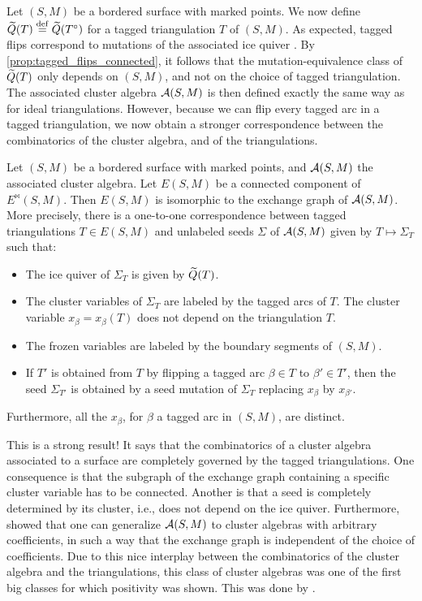 Let $(S, M)$ be a bordered surface with marked points. We now define $\widetilde{Q}(T) \overset{\mathrm{def}}{=}
	\widetilde{Q}(T^\circ)$ for a tagged triangulation $T$ of $(S, M)$. As expected, tagged flips
correspond to mutations of the associated ice quiver \parencite[Lemma 9.7]{FominShapiroThurston2008CATriangulatedSurfacesI}. By
\cref{prop:tagged_flips_connected}, it follows that the mutation-equivalence class of
$\widetilde{Q}(T)$ only depends on $(S, M)$, and not on the choice of tagged triangulation. The
associated cluster algebra $\mathcal{A}(S, M)$ is then defined exactly the same way as for
ideal triangulations. However, because we can flip every tagged arc in a tagged
triangulation, we now obtain a stronger correspondence between the combinatorics of the
cluster algebra, and of the triangulations.

\begin{theorem}\label{thm:clusters_and_triangulations}

	Let $(S, M)$ be a bordered surface with marked points, and $\mathcal{A}(S, M)$ the associated
	cluster algebra. Let $E(S, M)$ be a connected component of $E^{\bowtie}(S, M)$. Then
	$E(S, M)$ is isomorphic to the exchange graph of $\mathcal{A}(S, M)$. More precisely, there is
	a one-to-one correspondence between tagged triangulations $T \in E(S, M)$ and unlabeled
	seeds $\Sigma$ of $\mathcal{A}(S, M)$ given by $T \mapsto \Sigma_T$ such that:
	\begin{itemize}
		\item The ice quiver of $\Sigma_T$ is given by $\widetilde{Q}(T)$.
		\item The cluster variables of $\Sigma_T$ are labeled by the tagged arcs of $T$. The cluster
		      variable $x_\beta = x_\beta(T)$ does not depend on the triangulation $T$.
		\item The frozen variables are labeled by the boundary segments of $(S, M)$.
		\item If $T'$ is obtained from $T$ by flipping a tagged arc $\beta \in T$ to $\beta' \in T'$,
		      then the seed $\Sigma_{T'}$ is obtained by a seed mutation of $\Sigma_T$ replacing
		      $x_{\beta}$ by $x_{\beta'}$.
	\end{itemize}
	Furthermore, all the $x_\beta$, for $\beta$ a tagged arc in $(S,M)$, are distinct.
\end{theorem}

This is a strong result! It says that the combinatorics of a cluster algebra associated
to a surface are completely governed by the tagged triangulations. One consequence is
that the subgraph of the exchange graph containing a specific cluster variable has to
be connected. Another is that a seed is completely determined by its cluster, i.e.,
does not depend on the ice quiver. Furthermore,
\textcite{FominThurston2018CATriangulatedSurfacesII} showed that one can generalize
$\mathcal{A}(S, M)$ to cluster algebras with arbitrary coefficients, in such a way that the
exchange graph is independent of the choice of coefficients. Due to this nice interplay
between the combinatorics of the cluster algebra and the triangulations, this class of
cluster algebras was one of the first big classes for which positivity was shown. This
was done by \textcite{MusikerSchifflerWilliams2011PositivityCASurfaces}.

